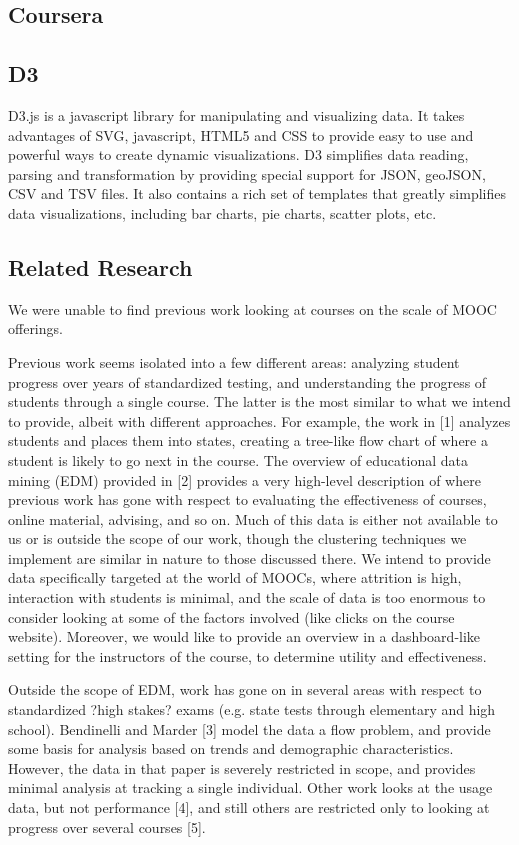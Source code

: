 
\subsection{Coursera}

\subsection{D3}
D3.js is a javascript library for manipulating and visualizing data. It takes advantages of SVG, javascript, HTML5 and CSS to provide easy to use and powerful ways to create dynamic visualizations. D3 simplifies data reading, parsing and transformation by providing special support for JSON, geoJSON, CSV and TSV files. It also contains a rich set of templates that greatly simplifies data visualizations, including bar charts, pie charts, scatter plots, etc.

\subsection{Related Research}
We were unable to find previous work looking at courses on the scale of MOOC offerings. 

Previous work seems isolated into a few different areas: analyzing student progress over years of standardized testing, and understanding the progress of students through a single course. The latter is the most similar to what we intend to provide, albeit with different approaches. For example, the work in [1] analyzes students and places them into states, creating a tree-like flow chart of where a student is likely to go next in the course. The overview of educational data mining (EDM) provided in [2] provides a very high-level description of where previous work has gone with respect to evaluating the effectiveness of courses, online material, advising, and so on. Much of this data is either not available to us or is outside the scope of our work, though the clustering techniques we implement are similar in nature to those discussed there. We intend to provide data specifically targeted at the world of MOOCs, where attrition is high, interaction with students is minimal, and the scale of data is too enormous to consider looking at some of the factors involved (like clicks on the course website). Moreover, we would like to provide an overview in a dashboard-like setting for the instructors of the course, to determine utility and effectiveness. 

Outside the scope of EDM, work has gone on in several areas with respect to standardized ?high stakes? exams (e.g. state tests through elementary and high school). Bendinelli and Marder [3] model the data a flow problem, and provide some basis for analysis based on trends and demographic characteristics. However, the data in that paper is severely restricted in scope, and provides minimal analysis at tracking a single individual. Other work looks at the usage data, but not performance [4], and still others are restricted only to looking at progress over several courses [5].
